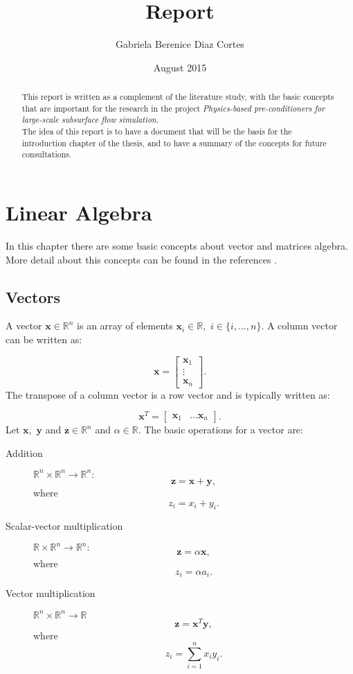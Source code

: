 \documentclass[12pt]{report}
\title{Report}
\author{Gabriela Berenice Diaz Cortes}
\date{August 2015}
\begin{document}
\maketitle
\begin{abstract}
 This report is written as a complement of the literature study, with the basic concepts that 
 are important for the research in the project \emph{Physics-based pre-conditioners for 
 large-scale subsurface flow simulation}.\\
 The idea of this report is to have a document that will be the basis for the introduction
 chapter of the thesis, and to have a summary of the concepts for future consultations.
\end{abstract}


\chapter{Linear Algebra}

In this chapter there are some basic concepts about vector and matrices algebra. More detail 
about this concepts can be found in the references \cite{Saad03,Golub96, Strang09}.
\section*{Vectors}
A vector $\mathbf{x} \in \mathbb{R}^n$ is an array of elements $\mathbf{x}_i \in \mathbb{R},$ $i\in \{ i,...,n\}$. A column vector can be written as:

\begin{equation*}
  \mathbf{x}=
 \begin{bmatrix}
\mathbf{x}_1 \\
 \vdots \\
\mathbf{x}_n
 \end{bmatrix}.
\end{equation*}
The transpose of a column vector is a row vector and is typically written as:

 \begin{equation*}
\mathbf{x}^T=
 \begin{bmatrix}
\mathbf{x}_1 & \dots\mathbf{x}_n
 \end{bmatrix}.
\end{equation*}
Let $\mathbf{x}, $ $\mathbf{y} $ and $\mathbf{z}\in \mathbb{R}^n$ and $\alpha \in \mathbb{R}$. 
The basic operations for a vector are:
\begin{description}
 \item[Addition]   $\mathbb{R}^{n} \times \mathbb{R}^{n} \xrightarrow{} \mathbb{R}^{n}:$
$$\mathbf{z}=\mathbf{x}+\mathbf{y},$$ where $$z_{i}=x_{i}+y_{i}.$$
\item [Scalar-vector multiplication] $\mathbb{R} \times \mathbb{R}^{n} \xrightarrow{} \mathbb{R}^{n}:$
$$\mathbf{z}=\alpha\mathbf{x},$$ where $$z_{i}=\alpha a_{i}.$$
\item [Vector multiplication] $\mathbb{R}^{n} \times \mathbb{R}^{n} \xrightarrow{} \mathbb{R}$
$$\mathbf{z}=\mathbf{x}^T\mathbf{y},$$ where $$z_{i}=\sum_{i=1}^nx_{i}y_{i}.$$
\end{description}
\end{document}
